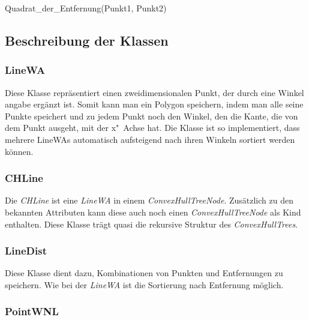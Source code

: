 \begin{function}[!ht]
	\caption{Quadrat\_der\_Entfernung(Punkt1, Punkt2)}
\end{function}


\clearpage
\subsection{Beschreibung der Klassen}\label{klassen}

\subsubsection{LineWA}\label{LineWA}

Diese Klasse repräsentiert einen zweidimensionalen Punkt, der durch eine Winkel angabe ergänzt ist. Somit kann man ein Polygon speichern, indem man alle seine Punkte speichert und zu jedem Punkt noch den Winkel, den die Kante, die von dem Punkt ausgeht, mit der x"~Achse hat. Die Klasse ist so implementiert, dass mehrere LineWAs automatisch aufsteigend nach ihren Winkeln sortiert werden können.

\subsubsection{CHLine}

Die \textit{CHLine} ist eine \textit{LineWA} in einem \textit{ConvexHullTreeNode}. Zusätzlich zu den bekannten Attributen kann diese auch noch einen \textit{ConvexHullTreeNode} als Kind enthalten. Diese Klasse trägt quasi die rekursive Struktur des \textit{ConvexHullTrees}.

\subsubsection{LineDist}

Diese Klasse dient dazu, Kombinationen von Punkten und Entfernungen zu  speichern. Wie bei der \textit{LineWA} ist die Sortierung nach Entfernung möglich.

\subsubsection{PointWNL}

